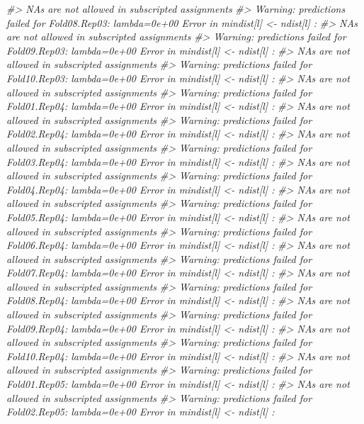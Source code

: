 \documentclass[]{book}
\newenvironment{Shaded}{\begin{snugshade}}{\end{snugshade}}
\newcommand{\CommentTok}[1]{\textcolor[rgb]{0.56,0.35,0.01}{\textit{#1}}}
\begin{document}
\begin{Shaded}
\begin{Highlighting}[]
\CommentTok{#>   NAs are not allowed in subscripted assignments}
\CommentTok{#> Warning: predictions failed for Fold08.Rep03: lambda=0e+00 Error in mindist[l] <- ndist[l] : }
\CommentTok{#>   NAs are not allowed in subscripted assignments}
\CommentTok{#> Warning: predictions failed for Fold09.Rep03: lambda=0e+00 Error in mindist[l] <- ndist[l] : }
\CommentTok{#>   NAs are not allowed in subscripted assignments}
\CommentTok{#> Warning: predictions failed for Fold10.Rep03: lambda=0e+00 Error in mindist[l] <- ndist[l] : }
\CommentTok{#>   NAs are not allowed in subscripted assignments}
\CommentTok{#> Warning: predictions failed for Fold01.Rep04: lambda=0e+00 Error in mindist[l] <- ndist[l] : }
\CommentTok{#>   NAs are not allowed in subscripted assignments}
\CommentTok{#> Warning: predictions failed for Fold02.Rep04: lambda=0e+00 Error in mindist[l] <- ndist[l] : }
\CommentTok{#>   NAs are not allowed in subscripted assignments}
\CommentTok{#> Warning: predictions failed for Fold03.Rep04: lambda=0e+00 Error in mindist[l] <- ndist[l] : }
\CommentTok{#>   NAs are not allowed in subscripted assignments}
\CommentTok{#> Warning: predictions failed for Fold04.Rep04: lambda=0e+00 Error in mindist[l] <- ndist[l] : }
\CommentTok{#>   NAs are not allowed in subscripted assignments}
\CommentTok{#> Warning: predictions failed for Fold05.Rep04: lambda=0e+00 Error in mindist[l] <- ndist[l] : }
\CommentTok{#>   NAs are not allowed in subscripted assignments}
\CommentTok{#> Warning: predictions failed for Fold06.Rep04: lambda=0e+00 Error in mindist[l] <- ndist[l] : }
\CommentTok{#>   NAs are not allowed in subscripted assignments}
\CommentTok{#> Warning: predictions failed for Fold07.Rep04: lambda=0e+00 Error in mindist[l] <- ndist[l] : }
\CommentTok{#>   NAs are not allowed in subscripted assignments}
\CommentTok{#> Warning: predictions failed for Fold08.Rep04: lambda=0e+00 Error in mindist[l] <- ndist[l] : }
\CommentTok{#>   NAs are not allowed in subscripted assignments}
\CommentTok{#> Warning: predictions failed for Fold09.Rep04: lambda=0e+00 Error in mindist[l] <- ndist[l] : }
\CommentTok{#>   NAs are not allowed in subscripted assignments}
\CommentTok{#> Warning: predictions failed for Fold10.Rep04: lambda=0e+00 Error in mindist[l] <- ndist[l] : }
\CommentTok{#>   NAs are not allowed in subscripted assignments}
\CommentTok{#> Warning: predictions failed for Fold01.Rep05: lambda=0e+00 Error in mindist[l] <- ndist[l] : }
\CommentTok{#>   NAs are not allowed in subscripted assignments}
\CommentTok{#> Warning: predictions failed for Fold02.Rep05: lambda=0e+00 Error in mindist[l] <- ndist[l] : }

\end{Highlighting}
\end{Shaded}
\end{document}
